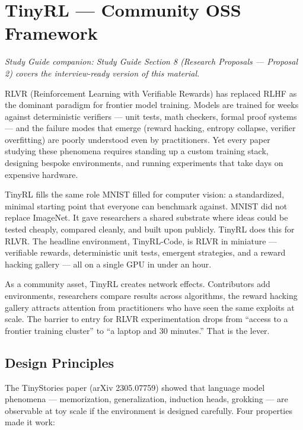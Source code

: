 \section{TinyRL --- Community OSS Framework}

\smallskip\noindent\textit{Study Guide companion: Study Guide Section 8 (Research Proposals --- Proposal 2) covers the interview-ready version of this material.}
\smallskip

\begin{whythis}
RLVR (Reinforcement Learning with Verifiable Rewards) has replaced RLHF as the dominant paradigm for frontier model training. Models are trained for weeks against deterministic verifiers --- unit tests, math checkers, formal proof systems --- and the failure modes that emerge (reward hacking, entropy collapse, verifier overfitting) are poorly understood even by practitioners. Yet every paper studying these phenomena requires standing up a custom training stack, designing bespoke environments, and running experiments that take days on expensive hardware.

TinyRL fills the same role MNIST filled for computer vision: a standardized, minimal starting point that everyone can benchmark against. MNIST did not replace ImageNet. It gave researchers a shared substrate where ideas could be tested cheaply, compared cleanly, and built upon publicly. TinyRL does this for RLVR. The headline environment, TinyRL-Code, is RLVR in miniature --- verifiable rewards, deterministic unit tests, emergent strategies, and a reward hacking gallery --- all on a single GPU in under an hour.

As a community asset, TinyRL creates network effects. Contributors add environments, researchers compare results across algorithms, the reward hacking gallery attracts attention from practitioners who have seen the same exploits at scale. The barrier to entry for RLVR experimentation drops from ``access to a frontier training cluster'' to ``a laptop and 30 minutes.'' That is the lever.
\end{whythis}

\subsection{Design Principles}

The TinyStories paper (arXiv 2305.07759) showed that language model phenomena --- memorization, generalization, induction heads, grokking --- are observable at toy scale if the environment is designed carefully. Four properties made it work:

